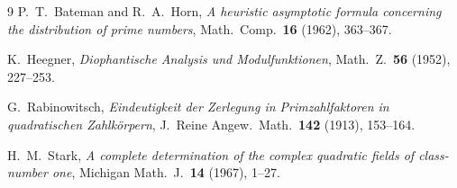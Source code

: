\documentclass[11pt,a4paper]{article}
\theoremstyle{definition}
\theoremstyle{remark}
\begin{document}
\begin{thebibliography}{9}
P.~T.~Bateman and R.~A.~Horn,
\emph{A heuristic asymptotic formula concerning the distribution of prime numbers},
Math.\ Comp.\ \textbf{16} (1962), 363--367.

K.~Heegner,
\emph{Diophantische Analysis und Modulfunktionen},
Math.\ Z.\ \textbf{56} (1952), 227--253.

G.~Rabinowitsch,
\emph{Eindeutigkeit der Zerlegung in Primzahlfaktoren in quadratischen Zahlk\"orpern},
J.\ Reine Angew.\ Math.\ \textbf{142} (1913), 153--164.

H.~M.~Stark,
\emph{A complete determination of the complex quadratic fields of class-number one},
Michigan Math.\ J.\ \textbf{14} (1967), 1--27.
\end{thebibliography}
\end{document}

